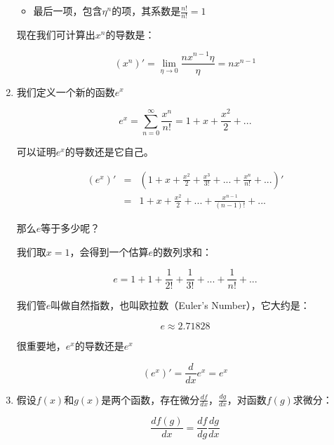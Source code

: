 \begin{enumerate}
\begin{itemize}
\item

最后一项，包含$\eta^n$的项，其系数是$\frac{n!}{n!} = 1$

\end{itemize}

现在我们可计算出$x^n$的导数是：

\begin{equation}
(x^n)' = \lim\limits_{\eta \to 0} \frac{n x^{n-1} \eta}{\eta } = n x^{n-1} 
\end{equation}

\item

我们定义一个新的函数$e^x$

\begin{equation}
e^x = \sum\limits_{n=0}^{\infty} \frac{x^n}{n!} = 1+x + \frac{x^2}{2} + ...
\end{equation}

可以证明$e^x$的导数还是它自己。

\begin{eqnarray*}
(e^x)' & = & ( 1 + x + \frac{x^2}{2} +  \frac{x^3}{3!} +... + \frac{x^n}{n!}  +... )' \\
{} & = & 1 + x + \frac{x^2}{2} + ... + \frac{x^{n-1}}{(n-1)!} + ...
\end{eqnarray*}

那么$e$等于多少呢？

我们取$x =1$，会得到一个估算$e$的数列求和：

\begin{equation}
e = 1 + 1 + \frac{1}{2!} + \frac{1}{3!} + ... + \frac{1}{n!} + ...
\end{equation}

我们管$e$叫做自然指数，也叫欧拉数（Euler's Number），它大约是：

\begin{equation}
e \approx 2.71828
\end{equation}

很重要地，$e^x$的导数还是$e^x$

\begin{equation}
(e^x)' = \frac{d}{dx} e^x = e^x
\end{equation}

\item

假设$f(x)$和$g(x)$是两个函数，存在微分$\frac{df}{dx}$，$\frac{dg}{dx}$，对函数$f(g)$求微分：

\begin{equation}
\frac{d f(g)}{d x} = \frac{d f}{d g} \frac{d g}{ d x}
\end{equation}


\end{enumerate}
